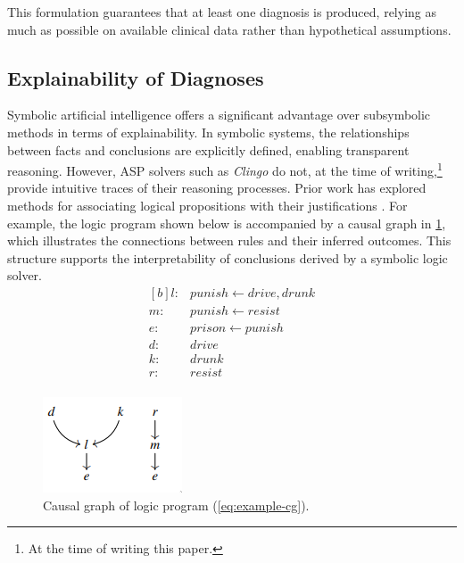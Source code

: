 \documentclass[10pt,leqno]{amsart}
\begin{document}
This formulation guarantees that at least one diagnosis is produced, 
relying as much as possible on available clinical data rather than hypothetical assumptions.

\subsection{Explainability of Diagnoses}

Symbolic artificial intelligence offers a significant advantage 
over subsymbolic methods in terms of explainability. 
In symbolic systems, the relationships between facts and conclusions are explicitly defined, 
enabling transparent reasoning. However, ASP solvers such as \textit{Clingo} do not, 
at the time of writing,\footnote{At the time of writing this paper.} 
provide intuitive traces of their reasoning processes. 
Prior work has explored methods for associating logical propositions 
with their justifications \cite{cabalar2014causal}. For example, 
the logic program shown below is accompanied by a causal graph 
in \cref{fig:causal-g}, which illustrates the connections 
between rules and their inferred outcomes. 
This structure supports the interpretability of conclusions derived by a symbolic logic solver.
\begin{equation}
\begin{aligned}[b]
    l :& punish \longleftarrow drive, drunk \\
    m :& punish \longleftarrow resist \\
    e :& prison \longleftarrow punish \\
    d :& drive \\
    k :& drunk \\
    r :& resist \\
\end{aligned}
\label{eq:example-cg}
\end{equation}

\begin{figure}
    \centering
    \includegraphics{assets/causal_g.png}
    \caption{Causal graph of logic program (\cref{eq:example-cg}).}
    \label{fig:causal-g}
\end{figure}
\end{document}
